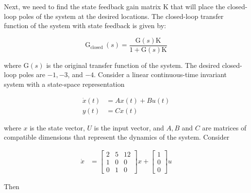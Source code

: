 \documentclass[main.tex]{subfiles}
\begin{document}
\begin{enumerate}
\begin{enumerate}
        Next, we need to find the state feedback gain matrix $\mathrm{K}$ that will place the closed-loop poles of the system at the desired locations. The closed-loop transfer function of the system with state feedback is given by:
        
        $$
        \mathrm{G}_{\text {closed }}(s)=\frac{\mathrm{G}(s) \mathrm{K}}{1+\mathrm{G}(s) \mathrm{K}}
        $$
        
        where $\mathrm{G}(s)$ is the original transfer function of the system. The desired closed-loop poles are $-1,-3$, and $-4$. Consider a linear continuous-time invariant system with a state-space representation
        
        $$
        \begin{aligned}
        \dot{x}(t) & =A x(t)+B u(t) \\
        y(t) & =C x(t)
        \end{aligned}
        $$
        
        where $x$ is the state vector, $U$ is the input vector, and $A, B$ and $C$ are matrices of compatible dimensions that represent the dynamics of the system. Consider
        
        $$
        \begin{aligned}
        \dot{x} &= \left[\begin{array}{ccc}
        2 & 5 & 12 \\
        1 & 0 & 0 \\
        0 & 1 & 0
        \end{array}\right] x+\left[\begin{array}{l}
        1 \\
        0 \\
        0
        \end{array}\right] u
        \end{aligned}
        $$
        
        Then


\end{enumerate}
\end{enumerate}
\end{document}
